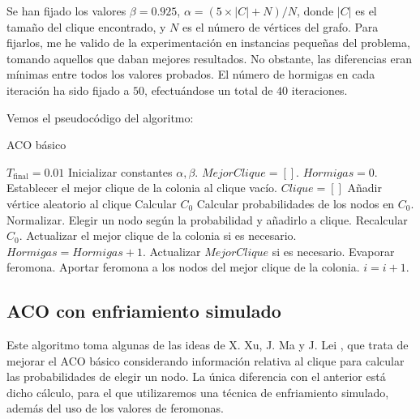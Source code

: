 Se han fijado los valores $\beta = 0.925$, $\alpha = (5 \times |C| + N) / N$, donde
$|C|$ es el tamaño del clique encontrado, y $N$ es el número de vértices del grafo.
Para fijarlos, me he valido de la experimentación en instancias pequeñas del problema,
tomando aquellos que daban mejores resultados. No obstante, las diferencias eran
mínimas entre todos los valores probados. El número de hormigas en cada iteración
ha sido fijado a $50$, efectuándose un total de $40$ iteraciones.

Vemos el pseudocódigo del algoritmo:

\begin{algorithm}[H]
\caption{ACO básico}
  \begin{algorithmic}
    \State $T_{\text{final}} = 0.01$
    \State Inicializar constantes $\alpha, \beta$.
    \State $Mejor Clique = []$.
    \Repeat
      \State $Hormigas = 0$.
      \State Establecer el mejor clique de la colonia al clique vacío.
      \Repeat
        \State $Clique = []$
        \State Añadir vértice aleatorio al clique
        \State Calcular $C_0$
        \Repeat
          \State Calcular probabilidades de los nodos en $C_0$. Normalizar.
          \State Elegir un nodo según la probabilidad y añadirlo a clique.
          \State Recalcular $C_0$.
        \State Actualizar el mejor clique de la colonia si es necesario.
        \State $Hormigas = Hormigas + 1$.
      \State Actualizar $Mejor Clique$ si es necesario.
      \State Evaporar feromona.
      \State Aportar feromona a los nodos del mejor clique de la colonia.
      \State $i = i+1$.
  \EndFunction
  \end{algorithmic}
\end{algorithm}


\subsection{ACO con enfriamiento simulado}\label{aco-sa}

Este algoritmo toma algunas de las ideas de X. Xu, J. Ma y J. Lei \citep{xu:2007},
que trata de mejorar el ACO básico considerando información relativa al clique
para calcular las probabilidades de elegir un nodo. La única diferencia con el
anterior está dicho cálculo, para el que utilizaremos una técnica de enfriamiento
simulado, además del uso de los valores de feromonas.

